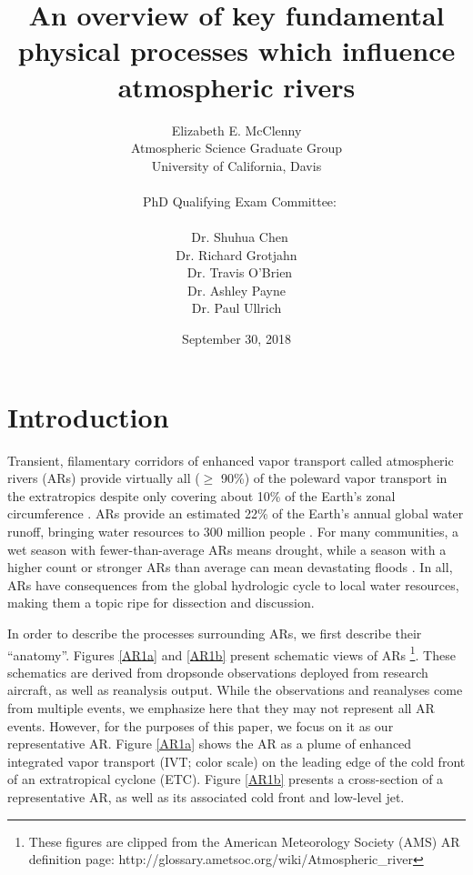 \documentclass[letterpaper,12pt]{article}
\title{An overview of key fundamental physical processes which influence atmospheric rivers}
\author{Elizabeth E. McClenny \protect\\ Atmospheric Science Graduate Group \protect\\ University of California, Davis \protect\\ \protect\\ \ PhD Qualifying Exam Committee: \protect\\ \protect\\ \ Dr. Shuhua Chen \protect\\  Dr. Richard Grotjahn  \protect\\ \ Dr. Travis O'Brien \protect\\ Dr. Ashley Payne \protect\\ Dr. Paul Ullrich}
\date{September 30, 2018}
\begin{document}
\raggedright
\maketitle
{}
\newpage
\tableofcontents
{}
\newpage
{}


\section{Introduction}

Transient, filamentary corridors of enhanced vapor transport called atmospheric rivers (ARs) provide virtually all ($\geq$ 90\%) of the poleward vapor transport in the extratropics despite only covering about 10\% of the Earth's zonal circumference \cite{Zhu1998}. ARs provide an estimated 22\% of the Earth's annual global water runoff, bringing water resources to 300 million people \cite{Paltan2017}. For many communities, a wet season with fewer-than-average ARs means drought, while a season with a higher count or stronger ARs than average can mean devastating floods \cite{Dettinger2011}. In all, ARs have consequences from the global hydrologic cycle to local water resources, making them a topic ripe for dissection and discussion.

In order to describe the processes surrounding ARs, we first describe their ``anatomy''. Figures \ref{AR1a} and \ref{AR1b} present schematic views of ARs \footnote{These figures are clipped from the American Meteorology Society (AMS) AR definition page: http://glossary.ametsoc.org/wiki/Atmospheric_river}. These schematics are derived from dropsonde observations deployed from research aircraft, as well as reanalysis output. While the observations and reanalyses come from multiple events, we emphasize here that they may not represent all AR events. However, for the purposes of this paper, we focus on it as our representative AR. Figure \ref{AR1a} shows the AR as a plume of enhanced integrated vapor transport (IVT; color scale) on the leading edge of the cold front of an extratropical cyclone (ETC). Figure \ref{AR1b} presents a cross-section of a representative AR, as well as its associated cold front and low-level jet. 
\end{document}
